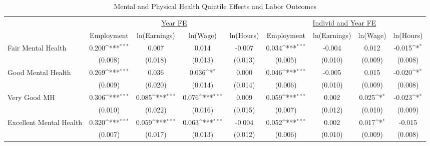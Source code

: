 \def\sym#1{\ifmmode^{#1}\else\(^{#1}\)\fi}
\begin{table}
\center\caption{Mental and Physical Health Quintile Effects and Labor Outcomes}
\footnotesize
\begin{tabular}{l*{8}{c}}
                    &\multicolumn{4}{c}{\underline{Year FE}}                                                &\multicolumn{4}{c}{\underline{Individ and Year FE}}                                    \\\cmidrule(lr){2-5}\cmidrule(lr){6-9}
                    &\multicolumn{1}{c}{Employment}&\multicolumn{1}{c}{ln(Earnings)}&\multicolumn{1}{c}{ln(Wage)}&\multicolumn{1}{c}{ln(Hours)}&\multicolumn{1}{c}{Employment}&\multicolumn{1}{c}{ln(Earnings)}&\multicolumn{1}{c}{ln(Wage)}&\multicolumn{1}{c}{ln(Hours)}\\
\hline
Fair Mental Health  &       0.200\sym{***}&       0.007         &       0.014         &      -0.007         &       0.034\sym{***}&      -0.004         &       0.012         &      -0.015\sym{*}  \\
                    &     (0.008)         &     (0.018)         &     (0.013)         &     (0.013)         &     (0.005)         &     (0.010)         &     (0.009)         &     (0.008)         \\
Good Mental Health  &       0.269\sym{***}&       0.036         &       0.036\sym{*}  &       0.000         &       0.046\sym{***}&      -0.005         &       0.015         &      -0.020\sym{*}  \\
                    &     (0.009)         &     (0.020)         &     (0.014)         &     (0.014)         &     (0.006)         &     (0.010)         &     (0.009)         &     (0.008)         \\
Very Good MH        &       0.306\sym{***}&       0.085\sym{***}&       0.076\sym{***}&       0.009         &       0.059\sym{***}&       0.002         &       0.025\sym{*}  &      -0.023\sym{*}  \\
                    &     (0.010)         &     (0.022)         &     (0.016)         &     (0.015)         &     (0.007)         &     (0.012)         &     (0.010)         &     (0.009)         \\
Excellent Mental Health&       0.320\sym{***}&       0.059\sym{***}&       0.063\sym{***}&      -0.004         &       0.052\sym{***}&       0.002         &       0.017\sym{*}  &      -0.015         \\
                    &     (0.007)         &     (0.017)         &     (0.013)         &     (0.012)         &     (0.006)         &     (0.010)         &     (0.009)         &     (0.008)         \\

\end{tabular}
\end{table}
